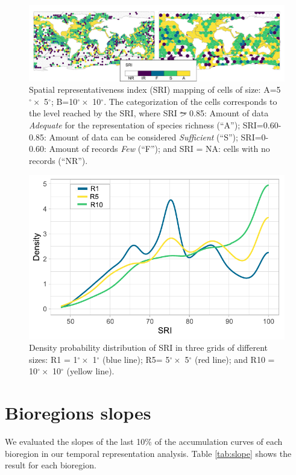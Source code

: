\documentclass[12pt,authoryear]{elsarticle}
\providecommand{\DIFaddtex}[1]{{\protect\color{blue}\uwave{#1}}} %
\providecommand{\DIFdeltex}[1]{{\protect\color{red}\sout{#1}}}                      %
\providecommand{\DIFaddend}{} %
\providecommand{\DIFaddFL}[1]{\DIFadd{#1}} %
\providecommand{\DIFdelFL}[1]{\DIFdel{#1}} %
\providecommand{\DIFaddbeginFL}{} %
\providecommand{\DIFaddendFL}{} %
\providecommand{\DIFdelbeginFL}{} %
\providecommand{\DIFdelendFL}{} %
\providecommand{\DIFadd}[1]{\texorpdfstring{\DIFaddtex{#1}}{#1}} %
\providecommand{\DIFdel}[1]{\texorpdfstring{\DIFdeltex{#1}}{}} %
\begin{document}
\DIFaddend \begin{figure}[h]
\centering
\DIFdelbeginFL %
\DIFdelendFL \DIFaddbeginFL \includegraphics[width=.99\textwidth]{Fig_AB}
\DIFaddendFL \caption[]{Spatial representativeness index (SRI) mapping of cells of size: A=5$^\circ \times$ 5$^\circ$; B=10$^\circ \times$ 10$^\circ$. The categorization of the cells corresponds to the level reached by the SRI, where SRI \DIFdelbeginFL \DIFdelFL{> }\DIFdelendFL \DIFaddbeginFL \DIFaddFL{$>$ }\DIFaddendFL 0.85: Amount of data \textit{Adequate} for the representation of species richness (``A''); SRI=0.60-0.85: Amount of data can be considered \textit{Sufficient} (``S''); SRI=0-0.60: Amount of records \textit{Few} (``F''); and SRI = NA: cells with no records (``NR'').
\label{fig:FigS1}}
\end{figure}

\begin{figure}[h]
  \centering
  \DIFdelbeginFL %
\DIFdelendFL \DIFaddbeginFL \includegraphics[width=.8\textwidth]{Fig_B8}
    \DIFaddendFL \caption{Density probability distribution of SRI in three grids of different sizes: R1 = 1$^\circ \times$ 1$^\circ$ (blue line); R5= 5$^\circ \times$ 5$^\circ$ (red line); and R10 = 10$^\circ \times$ 10$^\circ$ (yellow line).
    \label{fig:FigS2}
  }
\end{figure}


\section{Bioregions slopes}
We evaluated the slopes of the last 10\% of the accumulation curves of each bioregion in our temporal representation analysis. Table \ref{tab:slope} shows the result for each bioregion.
\end{document}
